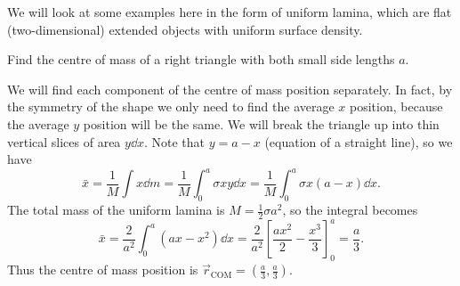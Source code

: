 \documentclass[../classical_mechanics.tex]{subfiles}
\begin{document}
        We will look at some examples here in the form of uniform lamina, which are flat (two-dimensional) extended objects with uniform surface density.
        \begin{example}
            Find the centre of mass of a right triangle with both small side lengths $a$.
            \begin{figure}[H]
                \centering
            \end{figure}
            
            We will find each component of the centre of mass position separately.
            In fact, by the symmetry of the shape we only need to find the average $x$ position, because the average $y$ position will be the same.
            We will break the triangle up into thin vertical slices of area $y\dd{x}$.
            Note that $y=a-x$ (equation of a straight line), so we have
            \begin{equation}
                \bar{x}=\frac{1}{M}\int x\dd{m}=\frac{1}{M}\int_0^a\sigma xy\dd{x}=\frac{1}{M}\int_0^a\sigma x(a-x)\dd{x}.
            \end{equation}
            The total mass of the uniform lamina is $M=\frac{1}{2}\sigma a^2$, so the integral becomes
            \begin{equation}
                \bar{x}=\frac{2}{a^2}\int_0^a(ax-x^2)\dd{x}=\frac{2}{a^2}\left[\frac{ax^2}{2}-\frac{x^3}{3}\right]_0^a=\frac{a}{3}.
            \end{equation}
            Thus the centre of mass position is $\vec{r}_\text{COM}=\left(\frac{a}{3},\frac{a}{3}\right)$.
        \end{example}
\end{document}

